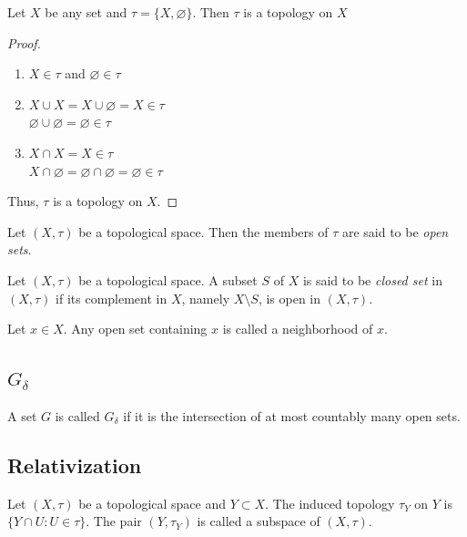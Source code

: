\documentclass[12pt]{article} %
\begin{document}
\begin{example}
Let $X$ be any set and $\tau=\{X,\varnothing\}$.  Then $\tau$ is a topology on $X$
\begin{proof}  ~\\
\begin{enumerate}
    \item $X \in \tau$ and $\varnothing \in \tau$
    \item $X \cup X=X \cup \varnothing= X \in \tau$\\
     $\varnothing \cup \varnothing = \varnothing \in \tau$
    \item $X \cap X= X \in \tau$\\
    $X \cap \varnothing=\varnothing \cap \varnothing = \varnothing \in \tau$
\end{enumerate}
Thus, $\tau$ is a topology on $X$.
\end{proof}
\end{example}


\begin{definition}\parencite{morris2020topology} 
Let $(X,\tau)$ be a topological space. Then the members of $\tau$ are said to be \emph{open sets}.
\end{definition}

\begin{definition}\parencite{morris2020topology}
Let $(X,\tau)$ be a topological space. A subset $S$ of $X$ is said to be \emph{closed set} in $(X,\tau)$ if its complement in $X$, namely $X \setminus S$, is open in $(X,\tau)$.
\end{definition}

\begin{definition}[Neighborhood]\parencite{holmes_topology}
Let $x \in X$. Any open set containing $x$ is called a neighborhood of $x$.
\end{definition}

\subsection{$G_{\delta}$}
\begin{definition} \parencite{Dugundji1966}
    A set $G$ is called $G_\delta$ if it is the intersection of at most countably many open sets.
\end{definition}
\subsection{Relativization}
\begin{definition}\parencite{Dugundji1966}
 Let $(X,\tau )$ be a topological space and $Y \subset X$. The induced topology $\tau_Y$ on
 $Y$ is $\{Y\cap U : U \in \tau\}$. The pair $(Y,\tau_Y)$ is called a subspace of $(X,\tau )$.
\end{definition}
\end{document}
